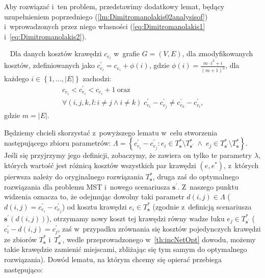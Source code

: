 Aby rozwiązać i~ten problem, przedstawimy dodatkowy lemat, będący uzupełnieniem poprzedniego (\ref{lm:Dimitromanolakis02analysisof}) i~wprowadzonych przez niego własności (\ref{eq:Dimitromanolakis1} i~\ref{eq:Dimitromanolakis2}).

\begin{lemma}~\cite{Dimitromanolakis02analysisof}\label{lm:Dimitromanolakis}
	Dla danych kosztów krawędzi $c_{e_{i}}$ w~grafie $G = \left( V, E \right)$, dla zmodyfikowanych kosztów, zdefiniowanych jako $c^{\prime}_{e_{i}} = c_{e_{i}} + \phi \left( i \right)$, gdzie $\phi \left( i \right) = \frac{m \cdot i^{2} + i}{\left( m + 1 \right)^{3}}$, dla każdego $i \in \left\{ 1, \dots, \left| E \right| \right\}$ zachodzi:
	\begin{gather}
		c_{e_{i}} < c^{\prime}_{e_{i}} < c_{e_{i}} + 1~\text{oraz}\label{eq:Dimitromanolakis3}\\
		\forall \left( i, j, k, l : i \neq j \wedge i \neq k \right) \; c^{\prime}_{e_{i}} - c^{\prime}_{e_{j}} \neq c^{\prime}_{e_{k}} - c^{\prime}_{e_{l}}\text{,}\label{eq:Dimitromanolakis4}
	\end{gather}
	gdzie $m = \left| E \right|$.
\end{lemma}

Będziemy chcieli skorzystać z~powyższego lematu w~celu stworzenia następującego zbioru parametrów: $\Lambda = \left\{ c^{\prime}_{e_{i}} - c^{\prime}_{e_{j}} : e_{i} \in T^{\ast}_{\textbf{s}} \setminus T^{\ast}_{\textbf{s}^{\prime}} \; \wedge \; e_{j} \in T^{\ast}_{\textbf{s}^{\prime}} \setminus T^{\ast}_{\textbf{s}} \right\}$.
Jeśli się przyjrzymy jego definicji, zobaczymy, że zawiera on tylko te parametry $\lambda$, których wartość jest różnicą kosztów wszystkich par krawędzi $\left( e, e^{\ast} \right)$, z~których pierwsza należy do oryginalnego rozwiązania $T^{\ast}_{\textbf{s}}$, druga zaś do optymalnego rozwiązania dla problemu \textsc{MST} i~nowego scenariusza $\textbf{s}^{\prime}$.
Z~naszego punktu widzenia oznacza to, że odejmując dowolny taki parametr $d \left( i, j \right) \in \Lambda$ ($d \left( i, j \right) = c^{\prime}_{e_{i}} - c^{\prime}_{e_{j}}$) od kosztu krawędzi $e_{i} \in T^{\ast}_{\textbf{s}}$ (zgodnie z~definicją scenariusza $\textbf{s}^{\prime} \left( d \left( i, j \right) \right)$), otrzymamy nowy koszt tej krawędzi równy wadze łuku $e_{j} \in T^{\ast}_{\textbf{s}^{\prime}}$ ($c^{\prime}_{i} - d \left( i, j \right) = c^{\prime}_{j}$, zaś w~przypadku zrównania się kosztów pojedynczych krawędzi ze zbiorów $T^{\ast}_{\textbf{s}}$ i~$T^{\ast}_{\textbf{s}^{\prime}}$, wedle przeprowadzonego w~\ref{th:incNetOpt} dowodu, możemy takie krawędzie zamienić miejscami, zbliżając się tym samym do optymalnego rozwiązania).
Dowód lematu, na którym chcemy się opierać przebiega następująco:

